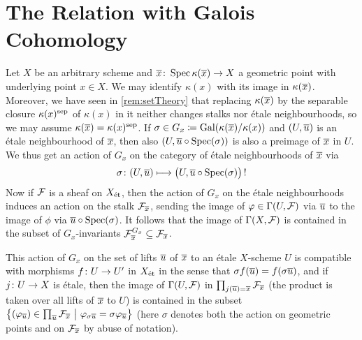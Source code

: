 \documentclass[a4paper, 10pt, oneside, DIV=9, chapterprefix=true, numbers=enddot, bibliography=totoc]{scrbook}
\begin{document}
\section{The Relation with Galois Cohomology}
\begin{rem}\label{rem:GaloisAction}
	Let $X$ be an arbitrary scheme and $\ov{x}\colon \Spec \kappa(\ov{x})\morphism X$ a geometric point with underlying point $x\in X$. We may identify $\kappa(x)$ with its image in $\kappa(\ov{x})$. Moreover, we have seen in \cref{rem:setTheory} that replacing $\kappa(\ov{x})$ by the separable closure $\kappa(x)^{\mathrm{sep}}$ of $\kappa(x)$ in it neither changes stalks nor étale neighbourhoods, so we may assume $\kappa(\ov{x})=\kappa(x)^\sep$. If $\sigma\in G_x\coloneqq \Gal(\kappa(\ov{x})/\kappa(x))$ and $(U,\ov{u})$ is an étale neighbourhood of $\ov{x}$, then also $(U,\ov{u}\circ \Spec(\sigma))$ is also a preimage of $\ov{x}$ in $U$. We thus get an action of $G_x$ on the category of étale neighbourhoods of $\ov{x}$ via
	\begin{equation*}
		\sigma\colon (U,\ov{u})\longmapsto \big(U,\ov{u}\circ \Spec(\sigma)\big)\,!
	\end{equation*}
	Now if $\mathcal{F}$ is a sheaf on $X_{\mathrm{\acute{e}t}}$, then the action of $G_x$ on the étale neighbourhoods induces an action on the stalk $\Ff_{\ov{x}}$, sending the image of $\varphi\in \operatorname{\Gamma}(U,\mathcal{F})$ via $\ov{u}$ to the image of $\phi$ via $\ov{u}\circ \Spec(\sigma)$. It follows that the image of $\operatorname{\Gamma}(X,\mathcal{F})$ is contained in the subset of $G_x$-invariants $\Ff_{\ov{x}}^{G_x}\subseteq \Ff_{\ov{x}}$.
	
	This action of $G_x$ on the set of lifts $\ov{u}$ of $\ov{x}$ to an étale $X$-scheme $U$ is compatible with morphisms $f\colon U\morphism U'$ in $X_{\mathrm{\acute{e}t}}$ in the sense that $\sigma f(\ov{u})=f(\sigma \ov{u})$, and if $j\colon U\morphism X$ is étale, then the image of $\operatorname{\Gamma}(U,\mathcal{F})$ in $\prod_{j(\ov{u})=\ov{x}}\Ff_{\ov{x}}$ (the product is taken over all lifts of $\ov{x}$ to $U$) is contained in the subset $\big\{(\phi_{\ov{u}})\in \prod_{\ov{u}}\Ff_{\ov{x}}\ \big|\ \phi_{\sigma \ov{u}}=\sigma \phi_{\ov{u}}\big\}$ (here $\sigma$ denotes both the action on geometric points and on $\Ff_{\ov{x}}$ by abuse of notation).
\end{rem}
\end{document}
